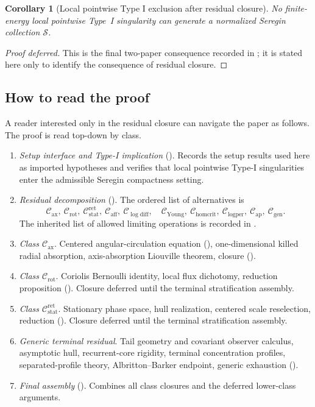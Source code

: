 \documentclass[11pt]{amsart}
\numberwithin{equation}{section}
\theoremstyle{plain}
\newtheorem{corollary}[corollary]{Corollary}
\theoremstyle{definition}
\theoremstyle{remark}
\newcommand{\calS}{\mathcal S}
\newcommand{\Cax}{\mathcal C_{\mathrm{ax}}}
\newcommand{\Crot}{\mathcal C_{\mathrm{rot}}}
\newcommand{\Cstat}{\mathcal C_{\mathrm{stat}}^{\mathrm{ret}}}
\newcommand{\Caff}{\mathcal C_{\mathrm{aff}}}
\newcommand{\Cgen}{\mathcal C_{\mathrm{gen}}}
\newcommand{\Chomcrit}{\mathcal C_{\mathrm{homcrit}}}
\newcommand{\Clogper}{\mathcal C_{\mathrm{logper}}}
\newcommand{\Capcrit}{\mathcal C_{\mathrm{ap}}}
\newcommand{\Cyoung}{\mathcal C_{\mathrm{Young}}}
\newcommand{\Clogdiff}{\mathcal C_{\log\mathrm{diff}}}
\begin{document}
\begin{corollary}[Local pointwise Type I exclusion after residual closure]
\label{cor:typeI-exclusion-main}
No finite-energy local pointwise Type~I singularity can generate a normalized
Seregin collection \(\calS\).
\end{corollary}

\begin{proof}[Proof deferred]
This is the final two-paper consequence recorded in
; it is stated here only to identify
the consequence of residual closure.
\end{proof}

\subsection{How to read the proof}
\label{subsec:reading-guide}

A reader interested only in the residual closure can navigate the paper as
follows.  The proof is read top-down by class.

\begin{enumerate}[label=\textup{(\arabic*)},leftmargin=2.2em]
   \item \emph{Setup interface and Type-I implication}
   (). Records the
   setup results used here as imported hypotheses and verifies that local pointwise
   Type-I singularities enter the admissible Seregin compactness setting.
   \item \emph{Residual decomposition} ().
   The ordered list of alternatives is
   \[
      \Cax,\ \Crot,\ \Cstat,\ \Caff,\ \Clogdiff,\quad
      \Cyoung,\ \Chomcrit,\ \Clogper,\ \Capcrit,\ \Cgen .
   \]
   The inherited list of allowed limiting operations is recorded in
   .
   \item \emph{Class \(\Cax\)}. Centered angular-circulation equation
   (), one-dimensional killed radial
   absorption, axis-absorption Liouville theorem, closure
   ().
   \item \emph{Class \(\Crot\)}. Coriolis Bernoulli identity, local flux
   dichotomy, reduction proposition
   ().  Closure deferred until the terminal
   stratification assembly.
   \item \emph{Class \(\Cstat\)}. Stationary phase space, hull realization,
   centered scale reselection, reduction
   ().
   Closure deferred until the terminal stratification assembly.
   \item \emph{Generic terminal residual}. Tail geometry and covariant observer
   calculus, asymptotic hull, recurrent-core rigidity, terminal concentration
   profiles, separated-profile theory, Albritton--Barker endpoint, generic
   exhaustion ().
   \item \emph{Final assembly} (). Combines all
   class closures and the deferred lower-class arguments.
\end{enumerate}
\end{document}
